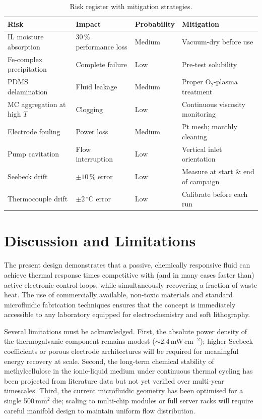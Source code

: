 \documentclass[11pt,a4paper]{article}
\begin{document}
\begin{table}[htbp]
\centering
\caption{Risk register with mitigation strategies.}
\label{tab:risk_register}
\small
\begin{tabular}{@{}p{3.2cm}p{2.8cm}p{2.2cm}p{4.5cm}@{}}
\toprule
\rowcolor{lightblue}
\textbf{Risk} & \textbf{Impact} & \textbf{Probability} & \textbf{Mitigation} \\
\midrule
IL moisture absorption      & 30\,\% performance loss & Medium & Vacuum-dry before use \\
Fe-complex precipitation    & Complete failure        & Low    & Pre-test solubility \\
PDMS delamination           & Fluid leakage           & Medium & Proper O$_2$-plasma treatment \\
MC aggregation at high $T$  & Clogging                & Low    & Continuous viscosity monitoring \\
Electrode fouling           & Power loss              & Medium & Pt mesh; monthly cleaning \\
Pump cavitation             & Flow interruption       & Low    & Vertical inlet orientation \\
Seebeck drift               & $\pm10$\,\% error       & Low    & Measure at start \& end of campaign \\
Thermocouple drift          & $\pm2$\,$^\circ$C error     & Low    & Calibrate before each run \\
\bottomrule
\end{tabular}
\end{table}

\section{Discussion and Limitations}
The present design demonstrates that a passive, chemically responsive fluid can achieve thermal response times competitive with (and in many cases faster than) active electronic control loops, while simultaneously recovering a fraction of waste heat. The use of commercially available, non-toxic materials and standard microfluidic fabrication techniques ensures that the concept is immediately accessible to any laboratory equipped for electrochemistry and soft lithography.

Several limitations must be acknowledged. First, the absolute power density of the thermogalvanic component remains modest ($\sim$2.4\,mW\,cm$^{-2}$); higher Seebeck coefficients or porous electrode architectures will be required for meaningful energy recovery at scale. Second, the long-term chemical stability of methylcellulose in the ionic-liquid medium under continuous thermal cycling has been projected from literature data but not yet verified over multi-year timescales. Third, the current microfluidic geometry has been optimised for a single 500\,mm$^2$ die; scaling to multi-chip modules or full server racks will require careful manifold design to maintain uniform flow distribution.
\end{document}
